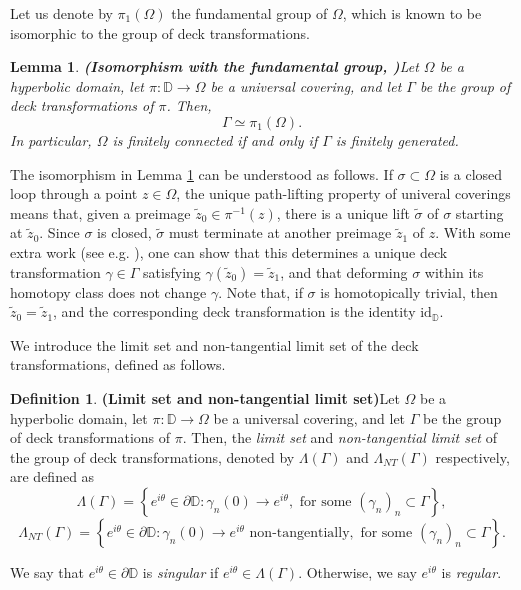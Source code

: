 \documentclass[11pt,a4paper,reqno]{amsart}
\theoremstyle{plain}
\newtheorem{lemma}[thm]{Lemma}
\theoremstyle{definition}
\newtheorem{defi}[thm]{Definition}
\theoremstyle{plain}
\renewcommand{\tilde}{\widetilde}
\begin{document}
Let us denote by $ \pi_1(\Omega) $ the fundamental group of $ \Omega $, which is known to be isomorphic to the group of deck transformations.
\begin{lemma}{\bf (Isomorphism with the fundamental group, {\normalfont\cite[Prop. 1.39]{Hat02}})}\label{lem:deck}
	Let $ \Omega $ be a hyperbolic domain, let $ \pi\colon\mathbb{D}\to \Omega $ be a universal covering, and let $ \Gamma $ be the group of deck transformations of $ \pi $. Then, $$\Gamma\simeq \pi_1(\Omega).$$ In particular, $ \Omega $ is finitely connected if and only if $ \Gamma $ is finitely generated.
\end{lemma}


The isomorphism in Lemma \ref{lem:deck} can be understood as follows. If $\sigma\subset\Omega$ is a closed loop through a point $z\in\Omega$, the unique path-lifting property of univeral coverings means that, given a preimage $\tilde z_0\in\pi^{-1}(z)$, there is a unique lift $\widetilde\sigma$ of $\sigma$ starting at $\tilde z_0$.  Since $\sigma$ is closed, $\widetilde\sigma$ must terminate at another preimage $\tilde z_1$ of $z$. With some extra work (see e.g. \cite[Sect. 1.3]{Hat02}), one can show that this determines a unique deck transformation $\gamma\in\Gamma$ satisfying $\gamma(\tilde z_0) = \tilde z_1$, and that deforming $\sigma$ within its homotopy class does not change $\gamma$. Note that, if $\sigma$ is homotopically trivial, then $\tilde z_0 = \tilde z_1$, and the corresponding deck transformation is the identity $ \textrm{id}_\mathbb{D} $.

We  introduce the {limit set} and {non-tangential limit set} of the deck transformations, defined as follows.
\begin{defi}{\bf (Limit set and non-tangential limit set)}\label{def-limit-set}
	Let $ \Omega $ be a hyperbolic domain, let $ \pi\colon\mathbb{D}\to \Omega $ be a universal covering, and let $ \Gamma $ be the group of deck transformations of $ \pi $. Then, the {\em limit set} and {\em non-tangential limit set} of the group of deck transformations, denoted by $\Lambda(\Gamma)$ and $\Lambda_{NT}(\Gamma)$ respectively, are defined as
	\[\Lambda(\Gamma)= \left\lbrace e^{i\theta}\in \partial\mathbb{D}\colon \gamma_n(0)\to e^{i\theta}, \textrm{ for some }(\gamma_n)_n\subset \Gamma\right\rbrace ,\]
	\[\Lambda_{NT}(\Gamma)= \left\lbrace e^{i\theta}\in \partial \mathbb{D}\colon \gamma_n(0)\to e^{i\theta}\textrm{ non-tangentially}, \textrm{ for some }(\gamma_n)_n\subset \Gamma\right\rbrace .\]
	
	\noindent	We say that $ e^{i\theta}\in\partial \mathbb{D} $  is {\em singular} if $ e^{i\theta}\in \Lambda(\Gamma) $. Otherwise, we say $ e^{i\theta}$ is {\em regular}.
\end{defi}
\end{document}
